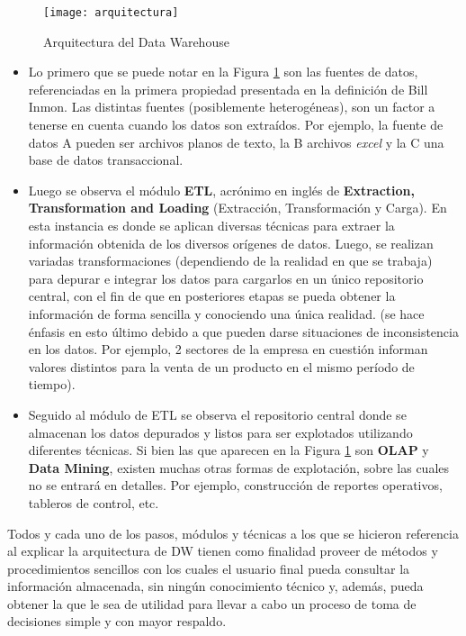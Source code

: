 \documentclass[a4paper,11pt]{article}
\begin{document}
    \begin{figure}
      \begin{center}
        \texttt{[image: arquitectura]}
        \caption{Arquitectura del Data Warehouse}
        \label{dw_arq}
      \end{center}
    \end{figure}
   
    \begin{itemize}
      \item Lo primero que se puede notar en la Figura \ref{dw_arq} son las fuentes de datos, referenciadas en la primera propiedad presentada en la
      definición de Bill Inmon. Las distintas fuentes (posiblemente heterogéneas), son un factor a tenerse en cuenta cuando los
      datos son extraídos. Por ejemplo, la fuente de datos A pueden ser archivos planos de texto, la B archivos \textit{excel} y la C una base de datos 
      transaccional.
    
      \item Luego se observa el módulo \textbf{ETL}, acrónimo en inglés de \textbf{Extraction, Transformation and Loading} (Extracción, Transformación y Carga).
      En esta instancia es donde se aplican diversas técnicas para extraer la información obtenida de
      los diversos orígenes de datos. Luego, se realizan variadas transformaciones (dependiendo de la realidad en que se
      trabaja) para depurar e integrar los datos para cargarlos en un único repositorio central, con el fin de que en posteriores etapas se pueda obtener
      la información de forma sencilla y conociendo una única realidad. (se hace énfasis en esto último debido a que pueden darse situaciones de
      inconsistencia en los datos. Por ejemplo, 2 sectores de la empresa en cuestión informan valores distintos para la venta de un producto en el mismo
      período de tiempo).
    
      \item Seguido al módulo de ETL se observa el repositorio central donde se almacenan los datos depurados y listos para ser explotados utilizando
      diferentes técnicas. Si bien las que aparecen en la Figura \ref{dw_arq} son \textbf{OLAP} y \textbf{Data Mining}, existen muchas otras formas de 
      explotación, sobre las cuales no se entrará en detalles. Por ejemplo, construcción de reportes operativos, tableros de control, etc.
    \end{itemize}

    Todos y cada uno de los pasos, módulos y técnicas a los que se hicieron referencia al explicar la arquitectura de DW tienen como finalidad
    proveer de métodos y procedimientos sencillos con los cuales el usuario final pueda consultar la información almacenada, sin ningún conocimiento técnico y,
    además, pueda obtener la que le sea de utilidad para llevar a cabo un proceso de toma de decisiones simple y con mayor respaldo.
    
\end{document}
